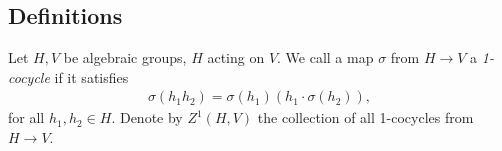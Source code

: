 % 
% 

\subsection{Definitions}
Let $H, V$ be algebraic groups, $H$ acting on $V$. We call a map $\sigma$ from $H\rightarrow V$ a  \emph{1-cocycle} if it satisfies
\begin{eqnarray}\label{theNonabOneCocycleCondition}
	\sigma(h_1h_2) = \sigma(h_1) (h_1\cdot\sigma(h_2)),
\end{eqnarray}
for all $h_1, h_2 \in H$. Denote by $Z^1\left( H, V \right)$ the collection of all 1-cocycles from $H\rightarrow V$.

